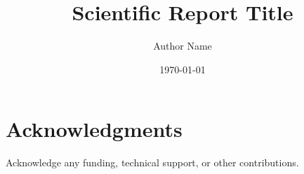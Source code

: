 \documentclass[12pt,a4paper]{article}
\title{Scientific Report Title}
\author{Author Name}
\date{\today}
\begin{document}
\maketitle








\section*{Acknowledgments}
Acknowledge any funding, technical support, or other contributions.



\end{document}
